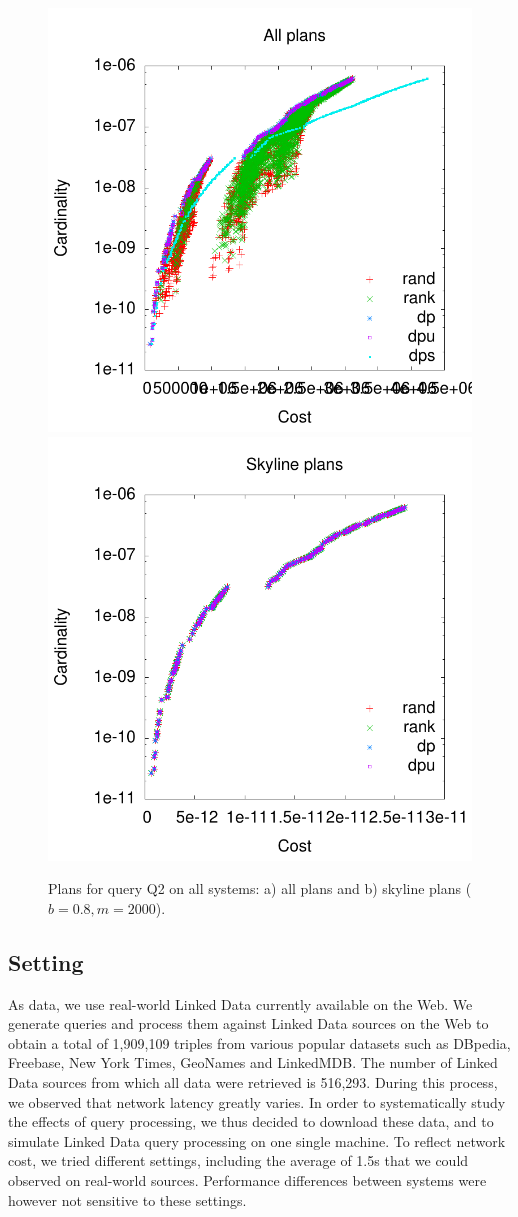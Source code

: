 \begin{figure}[htb]
  \centering
  \includegraphics[width=0.48\linewidth]{figs/plans_q2_all.pdf}
  \includegraphics[width=0.48\linewidth]{figs/plans_q2_sky.pdf}
  \caption{Plans for query Q2 on all systems: a) all plans and b)
    skyline plans ($b=0.8,m=2000$).}
  \label{fig:pareto_q2_skyline}
\end{figure}

\subsection{Setting} As data, we use real-world Linked Data currently available on the Web. We generate queries and process them against Linked Data sources on the Web to obtain a total of 1,909,109 triples from various popular datasets such as DBpedia, Freebase, New York Times, GeoNames and LinkedMDB. The number of Linked Data sources from which all data were retrieved is 516,293. During this process, we observed that network latency greatly varies. In order to systematically study the effects of query processing, we thus decided to download these data, and to simulate Linked Data query processing on one single machine. To reflect network cost, we tried different settings, including the average of 1.5s that we could observed on real-world sources. Performance differences between systems were however not sensitive to these settings. 

